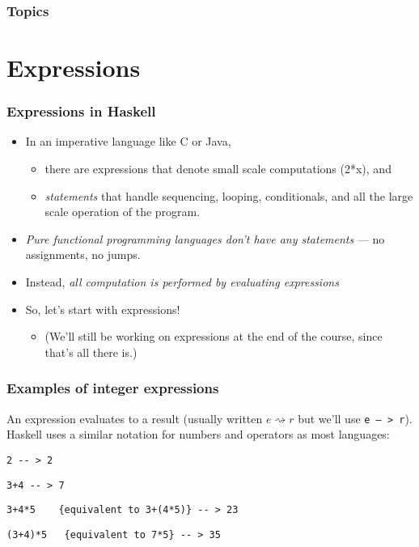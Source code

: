 \documentclass{beamer}
\begin{document}
\begin{frame}
  \PresentationTitleSlide
\end{frame}

\begin{frame}
 \frametitle{Topics}
 \tableofcontents
\end{frame}

\section{Expressions}

\begin{frame}
\frametitle{Expressions in Haskell}

\begin{itemize}
\item In an imperative language like C or Java,
  \begin{itemize}
  \item there are expressions that denote small scale computations
    (2*x), and
  \item  \emph{statements} that handle sequencing, looping,
    conditionals, and all the large scale operation of the program.
  \end{itemize}
\item \emph{Pure functional programming languages don't have any statements} --- no
  assignments, no jumps.
\item Instead, \emph{all computation is performed by evaluating
    expressions}
\item So, let's start with expressions!
  \begin{itemize}
  \item (We'll still be working on expressions at the end of the
    course, since that's all there is.)
  \end{itemize}
\end{itemize}

\end{frame}

\begin{frame}[fragile]
\frametitle{Examples of integer expressions}

An expression evaluates to a result (usually written $e \rightsquigarrow r$ but we'll use \texttt{e -- > r}).  Haskell uses a similar notation for numbers and operators as most languages:

\begin{verbatim}
2 -- > 2
\end{verbatim}

\begin{verbatim}
3+4 -- > 7
\end{verbatim}

\begin{verbatim}
3+4*5    {equivalent to 3+(4*5)} -- > 23
\end{verbatim}

\begin{verbatim}
(3+4)*5   {equivalent to 7*5} -- > 35    
\end{verbatim}

\end{frame}
\end{document}
